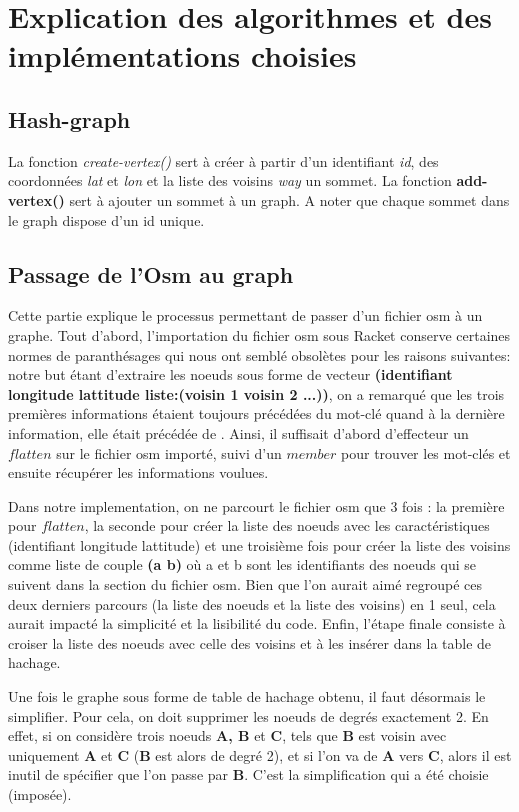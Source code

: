 \documentclass[french]{article}
\begin{document}
\section{Explication des algorithmes et des implémentations choisies}
\subsection{Hash-graph} 
La fonction \textit{{c}reate-vertex()} sert à créer à partir d'un identifiant \textit{id}, des coordonnées \textit{lat} et \textit{lon} et la liste des voisins \textit{way} un sommet. La fonction \textbf{add-vertex()} sert à ajouter un sommet à un graph. A noter que chaque sommet dans le graph dispose d'un id unique.    
\subsection{Passage de l'Osm au graph} 
Cette partie explique le processus permettant de passer d'un fichier osm à un graphe. Tout d'abord, l'importation du fichier osm sous Racket conserve certaines normes de paranthésages qui nous ont semblé obsolètes pour les raisons suivantes: notre but étant d'extraire les noeuds sous forme de vecteur \textbf{(identifiant longitude lattitude liste:(voisin 1 voisin 2 ...))}, on a remarqué que les trois premières informations étaient toujours précédées du mot-clé  quand à la dernière information, elle était précédée de . Ainsi, il suffisait d'abord d'effecteur un $flatten$ sur le fichier osm importé, suivi d'un $member$ pour trouver les mot-clés et ensuite récupérer les informations voulues.\newline

Dans notre implementation, on ne parcourt le fichier osm que 3 fois : la première pour $flatten$, la seconde pour créer la liste des noeuds avec les caractéristiques (identifiant longitude lattitude) et une troisième fois pour créer la liste des voisins comme liste de couple \textbf{(a b)} où a et b sont les identifiants des noeuds qui se suivent dans la section  du fichier osm. Bien que l'on aurait aimé regroupé ces deux derniers parcours (la liste des noeuds et la liste des voisins) en 1 seul, cela aurait impacté la simplicité et la lisibilité du code. 
\newline Enfin, l'étape finale consiste à croiser la liste des noeuds avec celle des voisins et à les insérer dans la table de hachage.\newline 

Une fois le graphe sous forme de table de hachage obtenu, il faut désormais le simplifier. Pour cela, on doit supprimer les noeuds de degrés exactement 2. En effet, si on considère trois noeuds \textbf{A, B} et \textbf{C}, tels que \textbf{B} est voisin avec uniquement \textbf{A} et \textbf{C} (\textbf{B} est alors de degré 2), et si l'on va de \textbf{A} vers \textbf{C}, alors il est inutil de spécifier que l'on passe par \textbf{B}. C'est la simplification qui a été choisie (imposée). \newline
\end{document}
